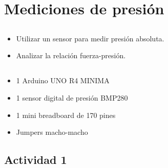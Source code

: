 \chapter{Mediciones de presión}
\section{\obj}
\capacidad
\begin{itemize}
\item Utilizar un sensor para medir presión absoluta.
\item Analizar la relación fuerza-presión.
\end{itemize}

\section{\mat}
\begin{itemize}
\item 1 Arduino UNO R4 MINIMA
\item 1 sensor digital de presión BMP280
\item 1 mini breadboard de 170 pines
\item Jumpers macho-macho
\end{itemize}

\section{Actividad 1}
